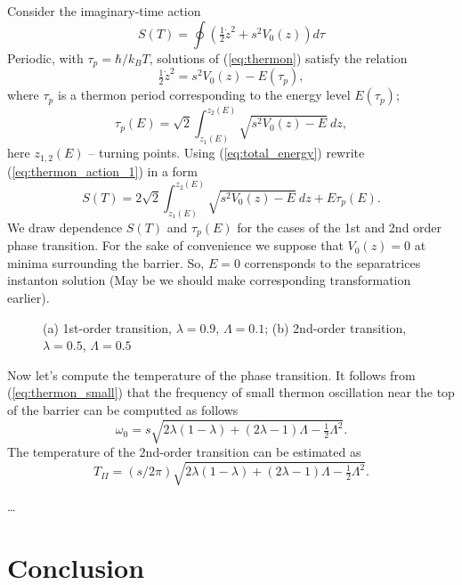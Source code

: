 \documentclass[aps, pre, preprint, groupedaddress, superscriptaddress, showkeys, showpacs] {revtex4-1}
\begin{document}
Consider the imaginary-time action
%
\begin{equation}
S(T) = \oint (\tfrac{1}{2} \dot{z}^2 + s^2 V_0(z)) d \tau
\label{eq:thermon_action_1}
\end{equation}
%
Periodic, with $\tau_p = \hbar / k_B T$, solutions of (\ref{eq:thermon}) satisfy the relation
%
\begin{equation}
\tfrac{1}{2} \dot{z}^2 = s^2 V_0(z) - E(\tau_p),
\label{eq:total_energy}
\end{equation}
%
where $\tau_p$ is a thermon period corresponding to the energy level $E(\tau_p)$;
%
\begin{equation}
\tau_p(E) = \sqrt{2} \int_{z_1(E)}^{z_2(E)} \sqrt{s^2 V_0(z) - E} ~dz,
\label{eq:thermon_period}
\end{equation}
%
here $z_{1,2}(E)$ -- turning points.
Using (\ref{eq:total_energy}) rewrite (\ref{eq:thermon_action_1}) in a form 
%
\begin{equation}
S(T) = 2\sqrt{2} \int_{z_1(E)}^{z_2(E)} \sqrt{s^2 V_0(z) - E} ~dz + E \tau_p (E).
\label{eq:thermon_action_2}
\end{equation}
%
We draw dependence $S(T)$ and $\tau_p(E)$ for the cases of the 1st and 2nd order phase transition.
For the sake of convenience we suppose that $V_0(z) = 0$ at minima surrounding the barrier.
So, $E = 0$ corrensponds to the separatrices instanton solution (May be we should make corresponding transformation earlier).
%
\begin{figure}[ht]
\caption{(a) 1st-order transition, $\lambda = 0.9$, $\Lambda = 0.1$; (b) 2nd-order transition, $\lambda = 0.5$, $\Lambda = 0.5$}
\end{figure}
%

Now let's compute the temperature of the phase transition.
It follows from (\ref{eq:thermon_small}) that the frequency of small thermon oscillation near the top of the barrier can be computted as follows
%
\begin{equation}
\omega_0 = s \sqrt{2 \lambda (1 - \lambda) + (2 \lambda - 1) \Lambda - \tfrac{1}{2} \Lambda^2}.
\label{eq:period_small}
\end{equation}
%
The temperature of the 2nd-order transition can be estimated as
\begin{equation}
T_{II} = (s  / 2 \pi) \sqrt{2 \lambda (1 - \lambda) + (2 \lambda - 1) \Lambda - \tfrac{1}{2} \Lambda^2}.
\end{equation}

\dots

\section{Conclusion \label{sec:conclusion}}

\pagebreak


\end{document}
